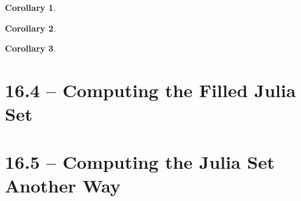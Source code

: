 \documentclass[symmetric]{tufte-handout}
\newtheorem{corollary}{Corollary}
\begin{document}
\begin{corollary}

\end{corollary}

\begin{corollary}

\end{corollary}

\begin{corollary}

\end{corollary}






\section{16.4 -- Computing the Filled Julia Set}\label{sec:problem-1}










\section{16.5 -- Computing the Julia Set Another Way}\label{sec:problem-1}
\end{document}
